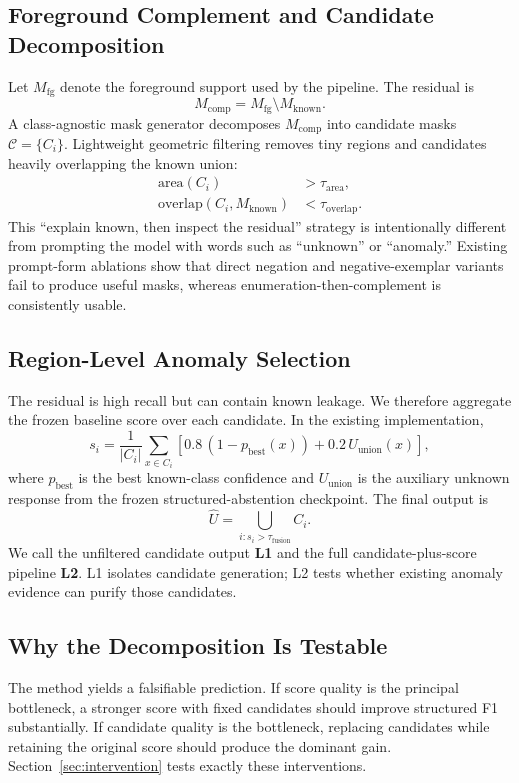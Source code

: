 \documentclass[journal]{IEEEtai}
\newcommand{\Cand}{\mathcal{C}}
\begin{document}
\subsection{Foreground Complement and Candidate Decomposition}
Let $M_{\mathrm{fg}}$ denote the foreground support used by the pipeline. The residual is
\begin{equation}
  M_{\mathrm{comp}} = M_{\mathrm{fg}} \setminus M_{\mathrm{known}}.
\end{equation}
A class-agnostic mask generator decomposes $M_{\mathrm{comp}}$ into candidate masks $\Cand=\{C_i\}$. Lightweight geometric filtering removes tiny regions and candidates heavily overlapping the known union:
\begin{align}
  \mathrm{area}(C_i) &> \tau_{\mathrm{area}},\\
  \mathrm{overlap}(C_i,M_{\mathrm{known}}) &< \tau_{\mathrm{overlap}}.
\end{align}
This ``explain known, then inspect the residual'' strategy is intentionally different from prompting the model with words such as ``unknown'' or ``anomaly.'' Existing prompt-form ablations show that direct negation and negative-exemplar variants fail to produce useful masks, whereas enumeration-then-complement is consistently usable.

\subsection{Region-Level Anomaly Selection}
The residual is high recall but can contain known leakage. We therefore aggregate the frozen baseline score over each candidate. In the existing implementation,
\begin{equation}
 s_i = \frac{1}{|C_i|}\sum_{x\in C_i}\left[0.8\,(1-p_{\mathrm{best}}(x))+0.2\,U_{\mathrm{union}}(x)\right],
 \label{eq:score}
\end{equation}
where $p_{\mathrm{best}}$ is the best known-class confidence and $U_{\mathrm{union}}$ is the auxiliary unknown response from the frozen structured-abstention checkpoint. The final output is
\begin{equation}
 \hat{U}=\bigcup_{i:s_i>\tau_{\mathrm{fusion}}} C_i.
\end{equation}
We call the unfiltered candidate output \textbf{L1} and the full candidate-plus-score pipeline \textbf{L2}. L1 isolates candidate generation; L2 tests whether existing anomaly evidence can purify those candidates.

\subsection{Why the Decomposition Is Testable}
The method yields a falsifiable prediction. If score quality is the principal bottleneck, a stronger score with fixed candidates should improve structured F1 substantially. If candidate quality is the bottleneck, replacing candidates while retaining the original score should produce the dominant gain. Section~\ref{sec:intervention} tests exactly these interventions.
\end{document}
